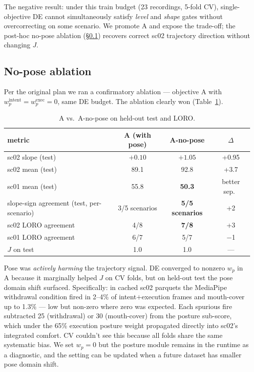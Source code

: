 \documentclass{article}
\begin{document}
The negative result: under this train budget (23 recordings, 5-fold CV), single-objective DE cannot simultaneously satisfy \emph{level} and \emph{shape} gates without overcorrecting on some scenario. We promote A and expose the trade-off; the post-hoc no-pose ablation (\S\ref{sec:nopose}) recovers correct sc02 trajectory direction without changing $J$.

\subsection{No-pose ablation}\label{sec:nopose}

Per the original plan we ran a confirmatory ablation --- objective A with $w_p^\text{intent} = w_p^\text{exec} = 0$, same DE budget. The ablation clearly won (Table~\ref{tab:nopose}).

\begin{table}[h]
\centering
\caption{A vs.\ A-no-pose on held-out test and LORO.}
\label{tab:nopose}
\small
\begin{tabular}{@{}lccc@{}}
\toprule
metric & A (with pose) & A-no-pose & $\Delta$ \\
\midrule
sc02 slope (test)              & $+0.10$ & \textbf{$+1.05$} & +0.95 \\
sc02 mean (test)               & 89.1 & 92.8 & +3.7 \\
sc01 mean (test)               & 55.8 & \textbf{50.3} & better sep.\ \\
slope-sign agreement (test, per-scenario) & 3/5 scenarios & \textbf{5/5 scenarios} & +2 \\
sc02 LORO agreement            & 4/8  & \textbf{7/8}  & +3 \\
sc01 LORO agreement            & 6/7  & 5/7  & $-$1 \\
$J$ on test                    & 1.0  & 1.0  & --- \\
\bottomrule
\end{tabular}
\end{table}

Pose was \emph{actively harming} the trajectory signal. DE converged to nonzero $w_p$ in A because it marginally helped $J$ on CV folds, but on held-out test the pose domain shift surfaced. Specifically: in cached sc02 parquets the MediaPipe withdrawal condition fired in 2--4\% of intent$+$execution frames and mouth-cover up to 1.3\% --- low but non-zero where zero was expected. Each spurious fire subtracted 25 (withdrawal) or 30 (mouth-cover) from the posture sub-score, which under the 65\% execution posture weight propagated directly into sc02's integrated comfort. CV couldn't see this because all folds share the same systematic bias. We set $w_p = 0$ but the posture module remains in the runtime as a diagnostic, and the setting can be updated when a future dataset has smaller pose domain shift.
\end{document}
